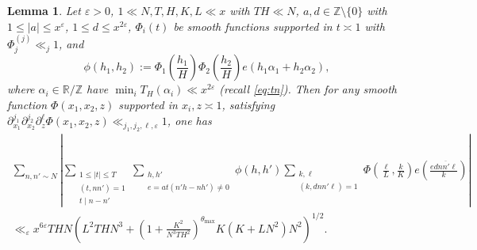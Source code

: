 \documentclass[reqno,11pt]{amsart}
\newtheorem{lemma}[theorem]{Lemma}
\theoremstyle{remark}
\numberwithin{equation}{section}
\newcommand{\Z}{\mathbb{Z}}
\newcommand{\R}{\mathbb{R}}
\newcommand{\eps}{\varepsilon}
\renewcommand{\bar}{\overline}
\begin{document}
\begin{lemma} \label{lem:consequence-incomplete} Let $\eps > 0$, $1 \ll N, T, H, K, L \ll x$ with $TH \ll N$, $a, d \in \Z \setminus \{0\}$ with $1 \le |a| \le x^\eps$, $1 \le d \le x^{2\eps}$, $\Phi_i(t)$ be smooth functions supported in $t \asymp 1$ with $\Phi_j^{(j)} \ll_j 1$, and 
\[
    \phi(h_1, h_2) := \Phi_1\left(\frac{h_1}{H}\right) \Phi_2\left(\frac{h_2}{H}\right) e(h_1\alpha_1 + h_2\alpha_2),
\]
where $\alpha_i \in \R/\Z$ have $\min_i T_H(\alpha_i) \ll x^{2\eps}$ (recall \cref{eq:tn}). Then for any smooth function $\Phi(x_1, x_2, z)$ supported in $x_i, z \asymp 1$, satisfying $\partial_{x_1}^{j_1} \partial_{x_2}^{j_2} \partial_z^{\ell} \Phi(x_1, x_2, z) \ll_{j_1,j_2,\ell,\eps} 1$, one has
\begin{equation} \label{eq:consequence-incomplete}
\begin{aligned}
    \sum_{n, n' \sim N}
    \left \vert
    \sum_{\substack{1 \le |t| \le T \\ (t, nn') = 1 \\ t \mid n - n'}} 
    \sum_{\substack{h, h' \\ e = at(n'h - nh') \neq 0}} \phi(h, h')
    \sum_{\substack{k, \ell \\ (k, dnn'\ell) = 1}}
    \Phi\left(\frac{\ell}{L}, \frac{k}{K}\right)
    e\left(\frac{e\bar{dnn'\ell}}{k}\right) \right \vert
    \\
    \ll_{\eps} x^{6\eps} THN 
    \left(L^2 TH N^3 + \left(1 + \frac{K^2}{N^3 TH^2}\right)^{\theta_{\max}} K \left(K + LN^2\right)N^2 \right)^{1/2}.
\end{aligned}
\end{equation}
\end{lemma}
\end{document}
